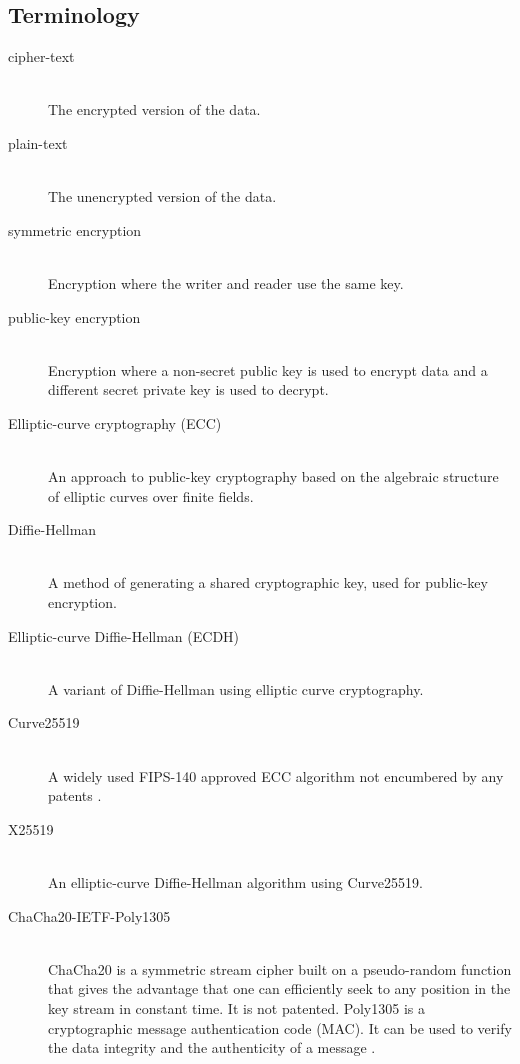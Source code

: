 \documentclass[10pt]{article}
\begin{document}
\subsection{Terminology}
\begin{description}
\item[cipher-text]~\\
The encrypted version of the data.

\item[plain-text]~\\
The unencrypted version of the data.

\item[symmetric encryption]~\\
Encryption where the writer and reader use the same key.

\item[public-key encryption]~\\
Encryption where a non-secret public key is used to encrypt data and a different secret private key is used to decrypt.

\item[Elliptic-curve cryptography (ECC)]~\\
An approach to public-key cryptography based on the algebraic structure of elliptic curves over finite fields.

\item[Diffie-Hellman]~\\
A method of generating a shared cryptographic key, used for public-key encryption.

\item[Elliptic-curve Diffie-Hellman (ECDH)]~\\
A variant of Diffie-Hellman using elliptic curve cryptography.

\item[Curve25519]~\\
A widely used FIPS-140 approved ECC algorithm not encumbered by any patents \cite{RFC7748}.

\item[X25519]~\\
An elliptic-curve Diffie-Hellman algorithm using Curve25519.

\item[ChaCha20-IETF-Poly1305]~\\
ChaCha20 is a symmetric stream cipher built on a pseudo-random function that gives the advantage that one can
efficiently seek to any position in the key stream in constant time.
It is not patented.
Poly1305 is a cryptographic message authentication code (MAC).
It can be used to verify the data integrity and the authenticity of a message \cite{RFC8439}.


\end{description}
\end{document}
